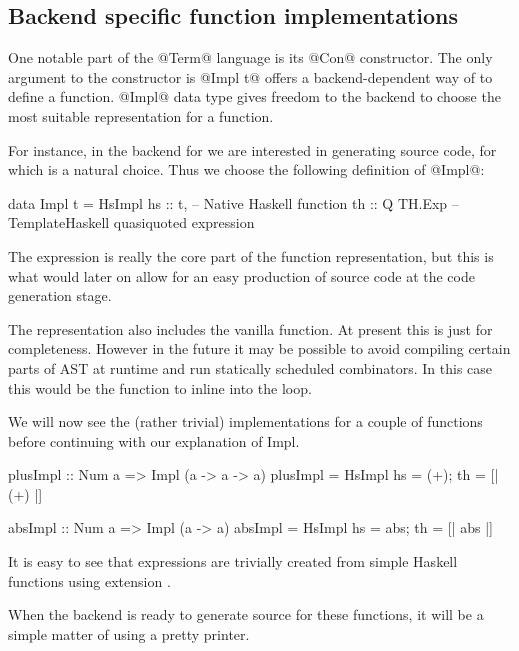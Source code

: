 \documentclass[preamble.tex]{subfiles}
\begin{document}


\subsection{Backend specific function implementations}

One notable part of the @Term@ language is its @Con@ constructor. The only argument to the constructor is @Impl t@ offers a backend-dependent way of to define a function. @Impl@ data type gives freedom to the backend to choose the most suitable representation for a function.

For instance, in the \Haskell backend for \LiveFusion we are interested in generating \Haskell source code, for which  \cite{TH} is a natural choice. Thus we choose the following definition of @Impl@:

\begin{hscode}
data Impl t = HsImpl {
                hs :: t,        -- Native Haskell function
                th :: Q TH.Exp  -- TemplateHaskell quasiquoted expression
              } 
\end{hscode}


The  expression is really the core part of the function representation, but this is what would later on allow for an easy production of \Haskell source code at the code generation stage.

The representation also includes the vanilla \Haskell function. At present this is just for completeness. However in the future it may be possible to avoid compiling certain parts of AST at runtime and run statically scheduled combinators. In this case this would be the function to inline into the loop.

We will now see the (rather trivial) implementations for a couple of functions before continuing with our explanation of Impl.

\begin{hscode}
plusImpl :: Num a => Impl (a -> a -> a)
plusImpl = HsImpl { hs = (+); th = [| (+) |] } 

absImpl :: Num a => Impl (a -> a)
absImpl = HsImpl { hs = abs; th = [| abs |] } 
\end{hscode}

It is easy to see that  expressions are trivially created from simple Haskell functions using  extension \cite{QQ}.

When the backend is ready to generate \Haskell source for these functions, it will be a simple matter of using a  pretty printer. 
\end{document}
